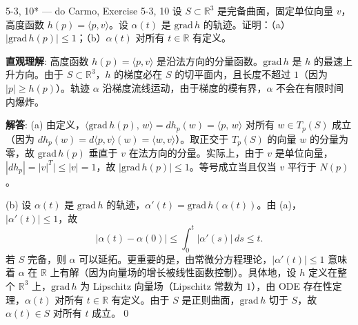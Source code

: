 \begin{exercise}{5-3, 10* — do Carmo, Exercise 5-3, 10}
设 $S \subset \mathbb{R}^3$ 是完备曲面，固定单位向量 $v$，高度函数 $h(p) = \langle p,v\rangle$。设 $\alpha(t)$ 是 $\mathrm{grad}\,h$ 的轨迹。证明：（a）$|\mathrm{grad}\,h(p)| \leq 1$；（b）$\alpha(t)$ 对所有 $t \in \mathbb{R}$ 有定义。
\end{exercise}
\begin{solution}
\textbf{直观理解}: 高度函数 $h(p) = \langle p,v\rangle$ 是沿法方向的分量函数。$\mathrm{grad}\,h$ 是 $h$ 的最速上升方向。由于 $S \subset \mathbb{R}^3$，$h$ 的梯度必在 $S$ 的切平面内，且长度不超过 $1$（因为 $|p| \geq h(p)$）。轨迹 $\alpha$ 沿梯度流线运动，由于梯度的模有界，$\alpha$ 不会在有限时间内爆炸。

\textbf{解答}: (a) 由定义，$\langle \mathrm{grad}\,h(p),\, w\rangle = dh_p(w) = \langle p,\, w\rangle$ 对所有 $w \in T_p(S)$ 成立（因为 $dh_p(w) = d\langle p,v\rangle(w) = \langle w,v\rangle$）。取正交于 $T_p(S)$ 的向量 $w$ 的分量为零，故 $\mathrm{grad}\,h(p)$ 垂直于 $v$ 在法方向的分量。实际上，由于 $v$ 是单位向量，$|dh_p| = |v|^T| \leq |v| = 1$，故 $|\mathrm{grad}\,h(p)| \leq 1$。等号成立当且仅当 $v$ 平行于 $N(p)$。

(b) 设 $\alpha(t)$ 是 $\mathrm{grad}\,h$ 的轨迹，$\alpha'(t) = \mathrm{grad}\,h(\alpha(t))$。由 (a)，$|\alpha'(t)| \leq 1$，故
\[
|\alpha(t) - \alpha(0)| \leq \int_0^t |\alpha'(s)|\,ds \leq t.
\]
若 $S$ 完备，则 $\alpha$ 可以延拓。更重要的是，由常微分方程理论，$|\alpha'(t)| \leq 1$ 意味着 $\alpha$ 在 $\mathbb{R}$ 上有解（因为向量场的增长被线性函数控制）。具体地，设 $h$ 定义在整个 $\mathbb{R}^3$ 上，$\mathrm{grad}\,h$ 为 Lipschitz 向量场（Lipschitz 常数为 $1$），由 ODE 存在性定理，$\alpha(t)$ 对所有 $t\in\mathbb{R}$ 有定义。由于 $S$ 是正则曲面，$\mathrm{grad}\,h$ 切于 $S$，故 $\alpha(t) \in S$ 对所有 $t$ 成立。\qed
\end{solution}

